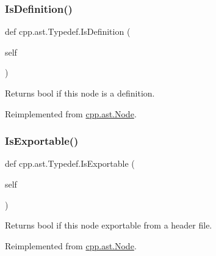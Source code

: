 \mbox{\label{classcpp_1_1ast_1_1_typedef_a103bf391e665884bfbfd20fc5e6d1a19}} 
\subsubsection{\texorpdfstring{IsDefinition()}{IsDefinition()}}
{\footnotesize\ttfamily def cpp.\+ast.\+Typedef.\+Is\+Definition (\begin{DoxyParamCaption}\item[{}]{self }\end{DoxyParamCaption})}

\begin{DoxyVerb}Returns bool if this node is a definition.\end{DoxyVerb}
 

Reimplemented from \mbox{\hyperlink{classcpp_1_1ast_1_1_node_a684ee9a357168e7e07a24fc6812f66e6}{cpp.\+ast.\+Node}}.

\mbox{\label{classcpp_1_1ast_1_1_typedef_adee58e4674b049d8e4435b5b6ad8e1d4}} 
\subsubsection{\texorpdfstring{IsExportable()}{IsExportable()}}
{\footnotesize\ttfamily def cpp.\+ast.\+Typedef.\+Is\+Exportable (\begin{DoxyParamCaption}\item[{}]{self }\end{DoxyParamCaption})}

\begin{DoxyVerb}Returns bool if this node exportable from a header file.\end{DoxyVerb}
 

Reimplemented from \mbox{\hyperlink{classcpp_1_1ast_1_1_node_a313273874ccf578485006d4000128234}{cpp.\+ast.\+Node}}.

\mbox{\label{classcpp_1_1ast_1_1_typedef_aa9f65f4a97ba340f2c9ebc5e7ce27e8c}} 
